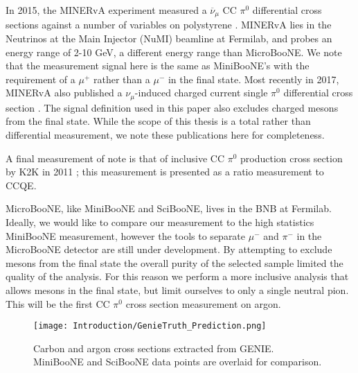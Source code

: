 \par In 2015, the MINERvA experiment measured a $\overline{\nu}_\mu$ CC $\pi^0$ differential cross sections against a number of variables on polystyrene \cite{bib:minerva_thesis} \cite{bib:minerva_paper}.  MINERvA lies in the Neutrinos at the Main Injector (NuMI) beamline at Fermilab, and probes an energy range of 2-10 GeV, a different energy range than MicroBooNE.  We note that the measurement signal here is the same as MiniBooNE's with the requirement of a $\mu^+$ rather than a $\mu^-$ in the final state. Most recently in 2017, MINERvA also published a $\nu_\mu$-induced charged current single $\pi^0$ differential cross section \cite{bib:minerva_paper_2017}.  The signal definition used in this paper also excludes charged mesons from the final state. While the scope of this thesis is a total rather than differential measurement, we note these publications here for completeness. 
\par A final measurement of note is that of inclusive CC $\pi^0$ production cross section by K2K in 2011 \cite{bib:k2k_paper}; this measurement is presented as a ratio measurement to CCQE.  
\par MicroBooNE, like MiniBooNE and SciBooNE, lives in the BNB at Fermilab. Ideally, we would like to compare our measurement to the high statistics MiniBooNE measurement, however the tools to separate $\mu^-$ and $\pi^-$ in the MicroBooNE detector are still under development. By attempting to exclude mesons from the final state the overall purity of the selected sample limited the quality of the analysis. For this reason we perform a more inclusive analysis that allows mesons in the final state, but limit ourselves to only a single neutral pion. This will be the first CC $\pi^0$ cross section measurement on argon.

\begin{figure}[h!]
\centering
\texttt{[image: Introduction/GenieTruth\_Prediction.png]}
\caption{ Carbon and argon cross sections extracted from GENIE. MiniBooNE and SciBooNE data points are overlaid for comparison. }
\label{fig:genie_extracted_xsec}
\end{figure}

